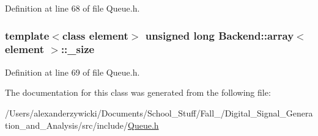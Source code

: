 Definition at line 68 of file Queue.\+h.

\hypertarget{class_backend_1_1array_ae51d64e87b42931946111c28b98e8a18}{
\subsubsection[{\+\_\+size}]{\setlength{\rightskip}{0pt plus 5cm}template$<$class element$>$ unsigned long {\bf Backend\+::array}$<$ element $>$\+::\+\_\+size\hspace{0.3cm}{\ttfamily [protected]}}}\label{class_backend_1_1array_ae51d64e87b42931946111c28b98e8a18}


Definition at line 69 of file Queue.\+h.



The documentation for this class was generated from the following file\+:\begin{DoxyCompactItemize}
\item 
/\+Users/alexanderzywicki/\+Documents/\+School\+\_\+\+Stuff/\+Fall\+\_/\+Digital\+\_\+\+Signal\+\_\+\+Generation\+\_\+and\+\_\+\+Analysis/src/include/\hyperlink{_queue_8h}{Queue.\+h}\end{DoxyCompactItemize}
